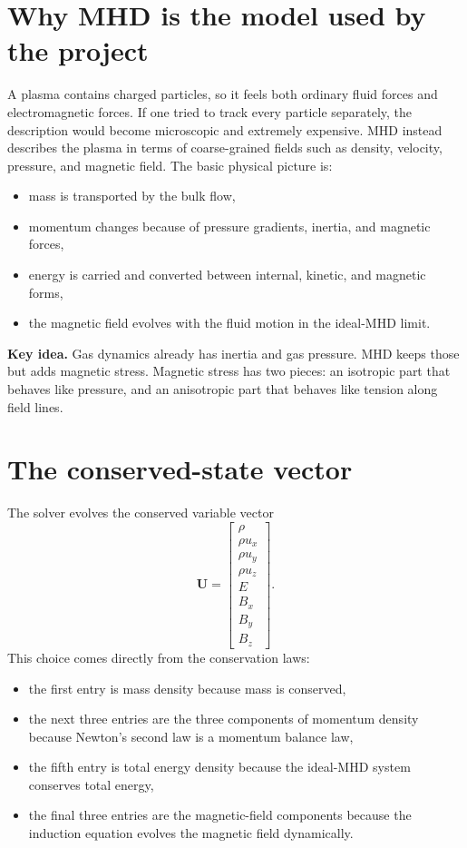 \documentclass[11pt]{article}
\newcommand{\Uvec}{\mathbf{U}}
\begin{document}
\section{Why MHD is the model used by the project}
A plasma contains charged particles, so it feels both ordinary fluid forces and electromagnetic forces. If one tried to track every particle separately, the description would become microscopic and extremely expensive. MHD instead describes the plasma in terms of coarse-grained fields such as density, velocity, pressure, and magnetic field. The basic physical picture is:
\begin{itemize}[leftmargin=1.8em]
    \item mass is transported by the bulk flow,
    \item momentum changes because of pressure gradients, inertia, and magnetic forces,
    \item energy is carried and converted between internal, kinetic, and magnetic forms,
    \item the magnetic field evolves with the fluid motion in the ideal-MHD limit.
\end{itemize}

\begin{physicsbox}
\textbf{Key idea.} Gas dynamics already has inertia and gas pressure. MHD keeps those but adds magnetic stress. Magnetic stress has two pieces: an isotropic part that behaves like pressure, and an anisotropic part that behaves like tension along field lines.
\end{physicsbox}

\section{The conserved-state vector}
The solver evolves the conserved variable vector
\begin{equation}
\Uvec =
\begin{bmatrix}
\rho \\
\rho u_x \\
\rho u_y \\
\rho u_z \\
E \\
B_x \\
B_y \\
B_z
\end{bmatrix}.
\label{eq:Uvec}
\end{equation}
This choice comes directly from the conservation laws:
\begin{itemize}[leftmargin=1.8em]
    \item the first entry is mass density because mass is conserved,
    \item the next three entries are the three components of momentum density because Newton's second law is a momentum balance law,
    \item the fifth entry is total energy density because the ideal-MHD system conserves total energy,
    \item the final three entries are the magnetic-field components because the induction equation evolves the magnetic field dynamically.
\end{itemize}
\end{document}
